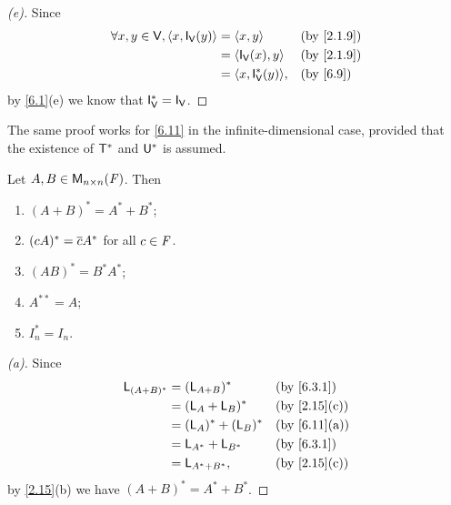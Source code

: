 \begin{proof}[(e)]
  Since
  \begin{align*}
    \forall x, y \in \V, \inn{x, \IT[\V](y)} & = \inn{x, y}             &  & \text{(by \cref{2.1.9})} \\
                                             & = \inn{\IT[\V](x), y}    &  & \text{(by \cref{2.1.9})} \\
                                             & = \inn{x, \IT[\V]^*(y)}, &  & \text{(by \cref{6.9})}
  \end{align*}
  by \cref{6.1}(e) we know that \(\IT[\V]^* = \IT[\V]\).
\end{proof}

\begin{note}
  The same proof works for \cref{6.11} in the infinite-dimensional case, provided that the existence of \(\mathsf{T}^*\) and \(\mathsf{U}^*\) is assumed.
\end{note}

\begin{cor}\label{6.3.2}
  Let \(A, B \in \mathsf{M}_{{n} \times n}({\mathit{F}})\).
  Then
  \begin{enumerate}
    \item \((A + B)^* = A^* + B^*\);
    \item \((cA)^* = \overline{c} A^*\) for all \(c \in \mathit{F}\).
    \item \((AB)^* = B^* A^*\);
    \item \(A^{**} = A\);
    \item \(I_n^* = I_n\).
  \end{enumerate}
\end{cor}

\begin{proof}[(a)]
  Since
  \begin{align*}
    \L_{(A + B)^*} & = (\L_{A + B})^*      &  & \text{(by \cref{6.3.1})}   \\
                   & = (\L_A + \L_B)^*     &  & \text{(by \cref{2.15}(c))} \\
                   & = (\L_A)^* + (\L_B)^* &  & \text{(by \cref{6.11}(a))} \\
                   & = \L_{A^*} + \L_{B^*} &  & \text{(by \cref{6.3.1})}   \\
                   & = \L_{A^* + B^*},     &  & \text{(by \cref{2.15}(c))}
  \end{align*}
  by \cref{2.15}(b) we have \((A + B)^* = A^* + B^*\).
\end{proof}

